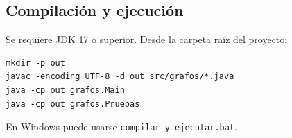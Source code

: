 \documentclass[conference]{IEEEtran}
\begin{document}
\subsection{Compilación y ejecución}
Se requiere JDK 17 o superior. Desde la carpeta raíz del proyecto:
\begin{lstlisting}[language={},numbers=none,xleftmargin=0pt,frame=single,basicstyle=\ttfamily\tiny]
mkdir -p out
javac -encoding UTF-8 -d out src/grafos/*.java
java -cp out grafos.Main
java -cp out grafos.Pruebas
\end{lstlisting}
En Windows puede usarse \texttt{compilar\_y\_ejecutar.bat}.
\end{document}
